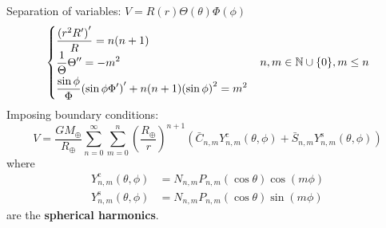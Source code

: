 \documentclass{beamer} %
\begin{document}
\begin{frame}
  Separation of variables: $V=R(r)\Theta(\theta)\Phi(\phi)$
  \begin{gather*}
    \begin{cases}
      \displaystyle\frac{{(r^2R')}'}{R}=n(n+1)                   \\
      \displaystyle\frac{1}{\Theta}\Theta''  =-m^2\vspace{0.1cm} \\
      \displaystyle\frac{\sin\phi}{\Phi}{(\sin\phi\Phi')}'+n(n+1){(\sin\phi)}^2  =m^2
    \end{cases}\!n,m\in\NN\cup\{0\}, m\leq n
  \end{gather*}\pause
  Imposing boundary conditions:
  \begin{equation*}
    V =\frac{GM_\oplus}{R_\oplus}\sum_{n=0}^\infty \sum_{m=0}^n{\left(\frac{{R_\oplus}}{r}\right)}^{n+1}(\bar{C}_{n,m}Y_{n,m}^{\mathrm{c}}(\theta,\phi)+\bar{S}_{n,m}Y_{n,m}^{\mathrm{s}}(\theta,\phi))
  \end{equation*}
  where
  \begin{align*}
    Y_{n,m}^{\mathrm{c}}(\theta,\phi) & =N_{n,m}P_{n,m}(\cos\theta)\cos(m\phi) \\
    Y_{n,m}^{\mathrm{s}}(\theta,\phi) & =N_{n,m}P_{n,m}(\cos\theta)\sin(m\phi)
  \end{align*}
  are the \textbf{spherical harmonics}.
\end{frame}
\end{document}
